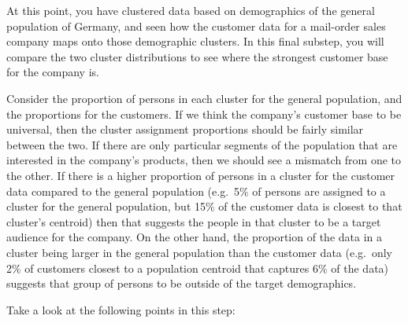 \documentclass[11pt]{article}
\begin{document}
At this point, you have clustered data based on demographics of the
general population of Germany, and seen how the customer data for a
mail-order sales company maps onto those demographic clusters. In this
final substep, you will compare the two cluster distributions to see
where the strongest customer base for the company is.

Consider the proportion of persons in each cluster for the general
population, and the proportions for the customers. If we think the
company's customer base to be universal, then the cluster assignment
proportions should be fairly similar between the two. If there are only
particular segments of the population that are interested in the
company's products, then we should see a mismatch from one to the other.
If there is a higher proportion of persons in a cluster for the customer
data compared to the general population (e.g.~5\% of persons are
assigned to a cluster for the general population, but 15\% of the
customer data is closest to that cluster's centroid) then that suggests
the people in that cluster to be a target audience for the company. On
the other hand, the proportion of the data in a cluster being larger in
the general population than the customer data (e.g.~only 2\% of
customers closest to a population centroid that captures 6\% of the
data) suggests that group of persons to be outside of the target
demographics.

Take a look at the following points in this step:
\end{document}
